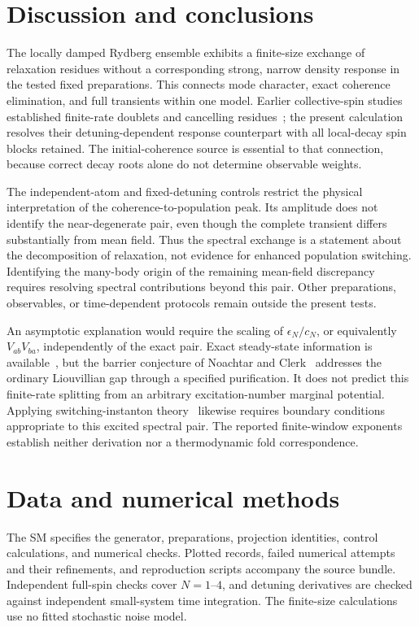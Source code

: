 \documentclass[aps,pra,twocolumn,superscriptaddress,amsmath,amssymb,reprint,floatfix]{revtex4-2}
\begin{document}
\section{Discussion and conclusions}
The locally damped Rydberg ensemble exhibits a finite-size exchange of relaxation residues without a corresponding strong, narrow density response in the tested fixed preparations. This connects mode character, exact coherence elimination, and full transients within one model. Earlier collective-spin studies established finite-rate doublets and cancelling residues~\cite{RubioGarcia2022,Molina2026}; the present calculation resolves their detuning-dependent response counterpart with all local-decay spin blocks retained. The initial-coherence source is essential to that connection, because correct decay roots alone do not determine observable weights.

The independent-atom and fixed-detuning controls restrict the physical interpretation of the coherence-to-population peak. Its amplitude does not identify the near-degenerate pair, even though the complete transient differs substantially from mean field. Thus the spectral exchange is a statement about the decomposition of relaxation, not evidence for enhanced population switching. Identifying the many-body origin of the remaining mean-field discrepancy requires resolving spectral contributions beyond this pair. Other preparations, observables, or time-dependent protocols remain outside the present tests.

An asymptotic explanation would require the scaling of $\epsilon_N/c_N$, or equivalently $V_{ab}V_{ba}$, independently of the exact pair. Exact steady-state information is available~\cite{RobertsClerk2023}, but the barrier conjecture of Noachtar and Clerk~\cite{NoachtarClerk2026} addresses the ordinary Liouvillian gap through a specified purification. It does not predict this finite-rate splitting from an arbitrary excitation-number marginal potential. Applying switching-instanton theory~\cite{PCE2026,CEP2026} likewise requires boundary conditions appropriate to this excited spectral pair. The reported finite-window exponents establish neither derivation nor a thermodynamic fold correspondence.

\section*{Data and numerical methods}
The SM specifies the generator, preparations, projection identities, control calculations, and numerical checks. Plotted records, failed numerical attempts and their refinements, and reproduction scripts accompany the source bundle. Independent full-spin checks cover $N=1$--$4$, and detuning derivatives are checked against independent small-system time integration. The finite-size calculations use no fitted stochastic noise model.
\end{document}
